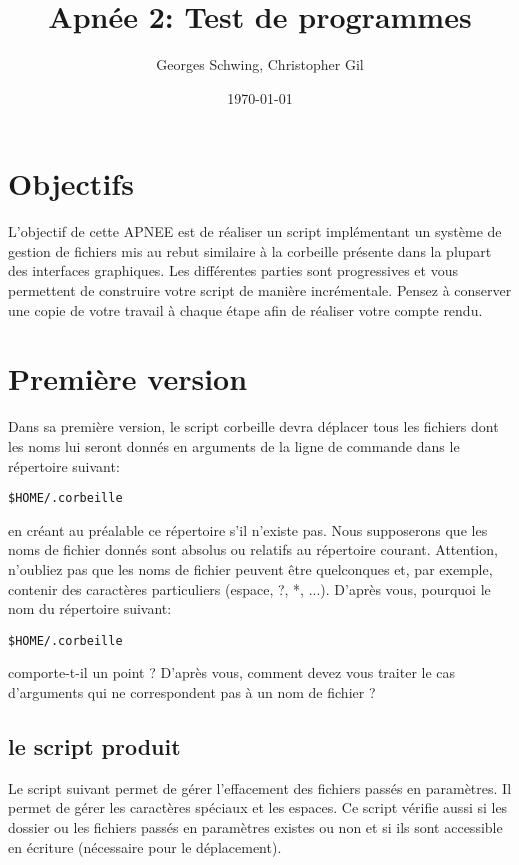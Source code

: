 \documentclass[12pt, a4paper]{article}
\title{Apn\'ee 2: Test de programmes}
\author{Georges Schwing, Christopher Gil}
\date{\today}
\begin{document}
\maketitle

\section{Objectifs}

L'objectif de cette APNEE est de réaliser un script implémentant un 
système de gestion de fichiers mis au rebut similaire à la corbeille 
présente dans la plupart des interfaces graphiques. Les différentes 
parties sont progressives et vous permettent de construire votre 
script de manière incrémentale. Pensez à conserver une copie de 
votre travail à chaque étape afin de réaliser votre compte rendu. 

\section{Première version}

Dans sa première version, le script corbeille devra déplacer tous 
les fichiers dont les noms lui seront donnés en arguments de la 
ligne de commande dans le répertoire suivant:
\begin{lstlisting}
$HOME/.corbeille
\end{lstlisting}
en créant au préalable ce répertoire s'il n'existe pas. Nous 
supposerons que les noms de fichier donnés sont absolus ou relatifs 
au répertoire courant. Attention, n'oubliez pas que les noms de 
fichier peuvent être quelconques et, par exemple, contenir des 
caractères particuliers (espace, ?, *, ...). D'après vous, pourquoi 
le nom du répertoire suivant: 
\begin{lstlisting}
$HOME/.corbeille 
\end{lstlisting} 
comporte-t-il un point ? D'après vous, comment devez vous traiter 
le cas d'arguments qui ne correspondent pas à un nom de fichier ?

\subsection{le script produit}

Le script suivant permet de gérer l'effacement des fichiers passés 
en paramètres. Il permet de gérer les caractères spéciaux et les 
espaces. Ce script vérifie aussi si les dossier ou les fichiers 
passés en paramètres existes ou non et si ils sont accessible en 
écriture (nécessaire pour le déplacement).
\end{document}
